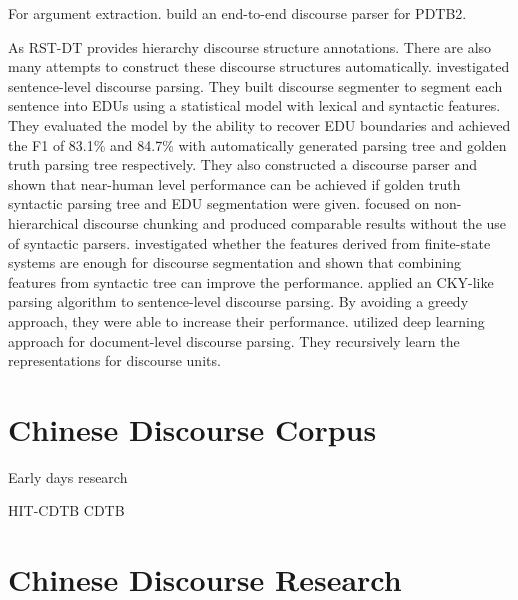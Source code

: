 For argument extraction.
\cite{lin2014pdtb} build an end-to-end discourse parser for PDTB2.

As RST-DT provides hierarchy discourse structure annotations. There are also many
attempts to construct these discourse structures automatically. \cite{soricut2003sentence}
investigated sentence-level discourse parsing. They built discourse segmenter to
segment each sentence into EDUs using a statistical model with lexical and syntactic features.
They evaluated the model by the ability to recover EDU boundaries and achieved the F1 of
83.1\% and 84.7\% with automatically generated parsing tree and golden truth parsing tree respectively.
They also constructed a discourse parser and shown that near-human level performance can be achieved
if golden truth syntactic parsing tree and EDU segmentation were given. \cite{sporleder2005} focused
on non-hierarchical discourse chunking and produced comparable results without the use of
syntactic parsers. \cite{fisher2007utility} investigated whether the features derived from finite-state
systems are enough for discourse segmentation and shown that combining features from syntactic tree
can improve the performance. \cite{joty2012novel} applied an CKY-like parsing algorithm
to sentence-level discourse parsing. By avoiding a greedy approach, they were able to increase
their performance. \cite{li2014recursive} utilized deep learning approach for document-level 
discourse parsing. They recursively learn the representations for discourse units.


\section{Chinese Discourse Corpus}

Early days research

HIT-CDTB
CDTB

\section{Chinese Discourse Research}



